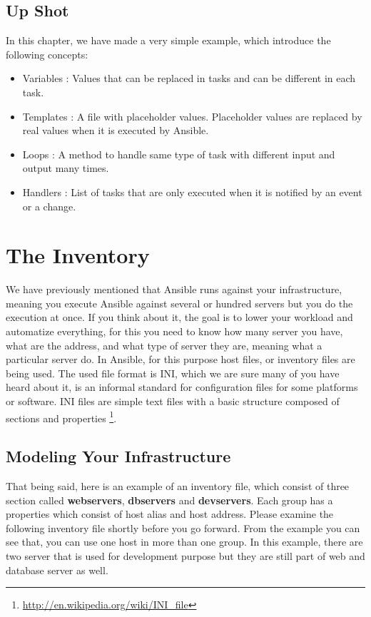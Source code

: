\documentclass[10pt]{book}
\begin{document}
\section{Up Shot}
In this chapter, we have made a very simple example, which introduce the 
following concepts:

\begin{itemize}
\item Variables : Values that can be replaced in tasks and can be different in each task.
\item Templates : A file with placeholder values. Placeholder values are replaced by real values 
when it is executed by Ansible. 
\item Loops : A method to handle same type of task with different input and output many times.
\item Handlers : List of tasks that are only executed when it is notified by an event or a 
change.
\end{itemize}







\chapter{The Inventory}
\label{chap-the-inventory}
We have previously mentioned that Ansible runs against your infrastructure, 
meaning you execute Ansible against several or hundred servers but you do the execution at once.
If you think about it, the goal is to lower your workload and automatize 
everything, for this you need to know how many server you have, what are the address, 
and what type of server they are, meaning what a particular server do. In Ansible, 
for this purpose host files, or inventory files are being used. 
The used file format is INI, which we are sure many of you have heard about it, 
is an informal standard for configuration files for some platforms or software. 
INI files are simple text files with a basic 
structure composed of sections and properties  \footnote { \url{http://en.wikipedia.org/wiki/INI_file}}. 

\section{Modeling Your Infrastructure}
\label{section:modeling-your-infrastructure}
That being said, here is an example of an inventory file, which consist of three section called {\bf webservers},
{\bf dbservers} and {\bf devservers}. Each group has a properties which consist 
of host alias and host address. Please examine the following inventory file shortly before you go forward.
From the example you can see that, you can use 
one host in more than one group. In this example, there are two server that is 
used for development purpose but they are still part of web and database server 
as well.
\end{document}
